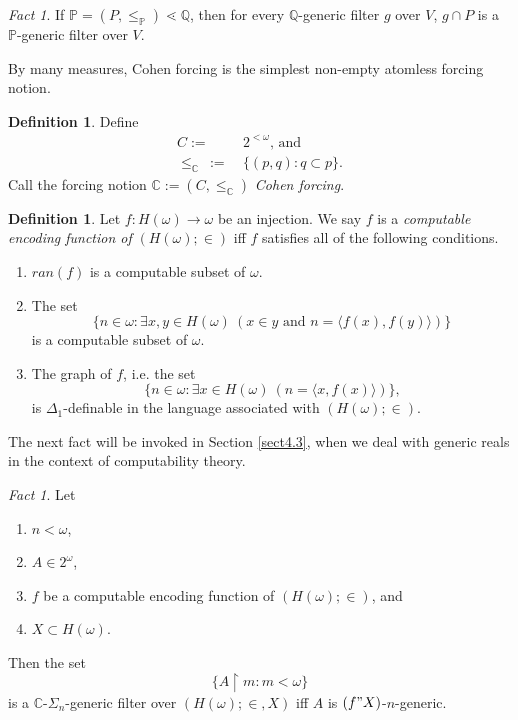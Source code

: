 \documentclass[12pt, twoside]{memoir}
\numberwithin{equation}{section}
\theoremstyle{definition}
\newtheorem{defi}[thm]{Definition}
\theoremstyle{remark}
\newtheorem{fact}[thm]{Fact}
\theoremstyle{definition}
\theoremstyle{definition}
\theoremstyle{definition}
\theoremstyle{remark}
\begin{document}
\begin{fact}\label{regsubo}
If $\mathbb{P} = (P, \leq_{\mathbb{P}}) \lessdot \mathbb{Q}$, then for every $\mathbb{Q}$-generic filter $g$ over $V$, $g \cap P$ is a $\mathbb{P}$-generic filter over $V$.
\end{fact}

By many measures, Cohen forcing is the simplest non-empty atomless forcing notion.

\begin{defi}
Define
\begin{align*}
    C := \ & 2^{< \omega} \text{, and} \\
    \leq_{\mathbb{C}} \ := \ & \{(p, q) : q \subset p\} \text{.}
\end{align*}
Call the forcing notion $\mathbb{C} := (C, \leq_{\mathbb{C}})$ \emph{Cohen forcing}.
\end{defi}

\begin{defi}\label{cefdef}
Let $f : H(\omega) \longrightarrow \omega$ be an injection. We say $f$ is a \emph{computable encoding function of} $(H(\omega); \in)$ iff $f$ satisfies all of the following conditions.
\begin{enumerate}[label=(\alph*)]
    \item $ran(f)$ is a computable subset of $\omega$.
    \item The set 
    \begin{equation*}
        \{n \in \omega : \exists x, y \in H(\omega) \ (x \in y \text{ and } n = \langle f(x), f(y) \rangle)\}
    \end{equation*}
    is a computable subset of $\omega$.
    \item The graph of $f$, i.e. the set 
    \begin{equation*}
        \{n \in \omega : \exists x \in H(\omega) \ (n = \langle x, f(x) \rangle )\} \text{,}
    \end{equation*}
    is $\Delta_1$-definable in the language associated with $(H(\omega); \in)$.
\end{enumerate}
\end{defi} 

The next fact will be invoked in Section \ref{sect4.3}, when we deal with generic reals in the context of computability theory.

\begin{fact}\label{f3230}
Let 
\begin{enumerate}[label=(\alph*)]
    \item $n < \omega$,
    \item $A \in 2^{\omega}$,
    \item $f$ be a computable encoding function of $(H(\omega); \in)$, and
    \item $X \subset H(\omega)$.
\end{enumerate}
Then the set $$\{A \restriction m : m < \omega\}$$ is a $\mathbb{C}$-$\Sigma_n$-generic filter over $(H(\omega); \in, X)$ iff $A$ is $(f" X)$-$n$-generic.
\end{fact}
\end{document}
